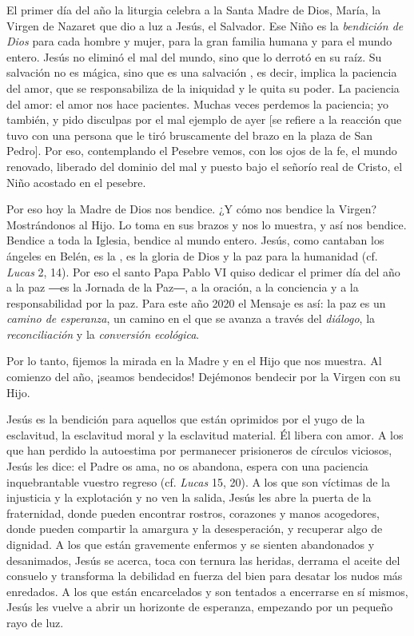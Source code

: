 \begin{body}
\begin{body}
El primer día del año la liturgia celebra a la Santa Madre de Dios, María, la Virgen de Nazaret que dio a luz a Jesús, el Salvador. Ese Niño es la \emph{bendición de Dios} para cada hombre y mujer, para la gran familia humana y para el mundo entero. Jesús no eliminó el mal del mundo, sino que lo derrotó en su raíz. Su salvación no es mágica, sino que es una salvación , es decir, implica la paciencia del amor, que se responsabiliza de la iniquidad y le quita su poder. La paciencia del amor: el amor nos hace pacientes. Muchas veces perdemos la paciencia; yo también, y pido disculpas por el mal ejemplo de ayer {[}se refiere a la reacción que tuvo con una persona que le tiró bruscamente del brazo en la plaza de San Pedro{]}. Por eso, contemplando el Pesebre vemos, con los ojos de la fe, el mundo renovado, liberado del dominio del mal y puesto bajo el señorío real de Cristo, el Niño acostado en el pesebre.

Por eso hoy la Madre de Dios nos bendice. ¿Y cómo nos bendice la Virgen? Mostrándonos al Hijo. Lo toma en sus brazos y nos lo muestra, y así nos bendice. Bendice a toda la Iglesia, bendice al mundo entero. Jesús, como cantaban los ángeles en Belén, es la , es la gloria de Dios y la paz para la humanidad (cf. \emph{Lucas} 2, 14). Por eso el santo Papa Pablo VI quiso dedicar el primer día del año a la paz ―es la Jornada de la Paz―, a la oración, a la conciencia y a la responsabilidad por la paz. Para este año 2020 el Mensaje es así: la paz es un \emph{camino de esperanza}, un camino en el que se avanza a través del \emph{diálogo}, la \emph{reconciliación} y la \emph{conversión ecológica}.

Por lo tanto, fijemos la mirada en la Madre y en el Hijo que nos muestra. Al comienzo del año, ¡seamos bendecidos! Dejémonos bendecir por la Virgen con su Hijo.

Jesús es la bendición para aquellos que están oprimidos por el yugo de la esclavitud, la esclavitud moral y la esclavitud material. Él libera con amor. A los que han perdido la autoestima por permanecer prisioneros de círculos viciosos, Jesús les dice: el Padre os ama, no os abandona, espera con una paciencia inquebrantable vuestro regreso (cf. \emph{Lucas} 15, 20). A los que son víctimas de la injusticia y la explotación y no ven la salida, Jesús les abre la puerta de la fraternidad, donde pueden encontrar rostros, corazones y manos acogedores, donde pueden compartir la amargura y la desesperación, y recuperar algo de dignidad. A los que están gravemente enfermos y se sienten abandonados y desanimados, Jesús se acerca, toca con ternura las heridas, derrama el aceite del consuelo y transforma la debilidad en fuerza del bien para desatar los nudos más enredados. A los que están encarcelados y son tentados a encerrarse en sí mismos, Jesús les vuelve a abrir un horizonte de esperanza, empezando por un pequeño rayo de luz.


\end{body}
\end{body}
